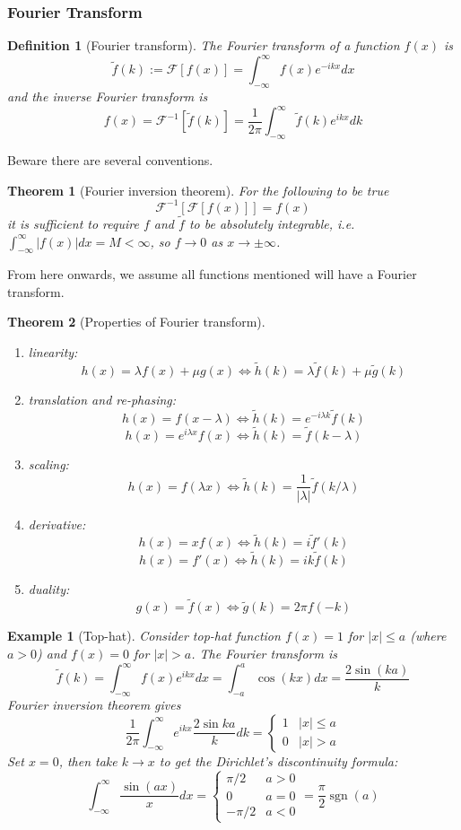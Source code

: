 \documentclass[a4paper]{article}
\DeclareMathOperator{\sgn}{sgn}
\newtheorem{eg}{Example}[section]
\theoremstyle{new}
\newtheorem{defi}{Definition}[section]
\newtheorem{thm}{Theorem}[section]
\begin{document}
\subsubsection{Fourier Transform}
\begin{defi}[Fourier transform]
The Fourier transform of a function $f(x)$ is
$$\tilde{f}(k):=\mathcal{F}[f(x)]=\int_{-\infty}^\infty f(x)e^{-ikx}dx$$
and the inverse Fourier transform is
$$f(x)=\mathcal{F}^{-1}[\tilde{f}(k)]=\frac{1}{2\pi}\int_{-\infty}^\infty\tilde{f}(k)e^{ikx}dk$$
\end{defi}
Beware there are several conventions.
\begin{thm}[Fourier inversion theorem]
For the following to be true
$$\mathcal{F}^{-1}[\mathcal{F}[f(x)]]=f(x)$$
it is sufficient to require $f$ and $\tilde{f}$ to be absolutely integrable, i.e. $\int_{-\infty}^\infty|f(x)|dx=M<\infty$, so $f\rightarrow 0$ as $x\rightarrow\pm\infty$.
\end{thm}
From here onwards, we assume all functions mentioned will have a Fourier transform.
\begin{thm}[Properties of Fourier transform]\leavevmode
\begin{enumerate}
    \item linearity: 
$$h(x)=\lambda f(x)+\mu g(x)\iff\tilde{h}(k)=\lambda\tilde{f}(k)+\mu\tilde{g}(k)$$
    \item translation and re-phasing:
$$ h(x)=f(x-\lambda)\iff\tilde{h}(k)=e^{-i\lambda k}\tilde{f}(k)$$
$$h(x)=e^{i\lambda x}f(x)\iff\tilde{h}(k)=\tilde{f}(k-\lambda)$$
    \item scaling:
$$h(x)=f(\lambda x)\iff\tilde{h}(k)=\frac{1}{|\lambda|}\tilde{f}(k/\lambda)$$
    \item derivative:
$$h(x)=xf(x)\iff\tilde{h}(k)=i\tilde{f}'(k)$$
$$h(x)=f'(x)\iff\tilde{h}(k)=ik\tilde{f}(k)$$
    \item duality:
$$g(x)=\tilde{f}(x)\iff\tilde{g}(k)=2\pi f(-k)$$
\end{enumerate}
\end{thm}
\begin{eg}[Top-hat]
Consider top-hat function $f(x)=1$ for $|x|\leq a$ (where $a>0$) and $f(x)=0$ for $|x|>a$. The Fourier transform is
$$\tilde{f}(k)=\int_{-\infty}^\infty f(x)e^{ikx}dx=\int_{-a}^a\cos(kx)dx=\frac{2\sin(ka)}{k}$$
Fourier inversion theorem gives
$$   \frac{1}{2\pi}\int_{-\infty}^\infty e^{ikx}\frac{2\sin ka}{k}dk=
\left\{
        \begin{array}{ll}
      1 & |x|\leq a\\
      0 & |x|>a
        \end{array}
    \right.$$
Set $x=0$, then take $k\rightarrow x$ to get the Dirichlet's discontinuity formula:
$$\int_{-\infty}^\infty\frac{\sin(ax)}{x}dx=\left\{
        \begin{array}{ll}
      \pi/2 & a>0\\
      0 & a=0\\
      -\pi/2 & a<0
        \end{array}
    \right.=\frac{\pi}{2}\sgn(a)$$
\end{eg}
\end{document}
